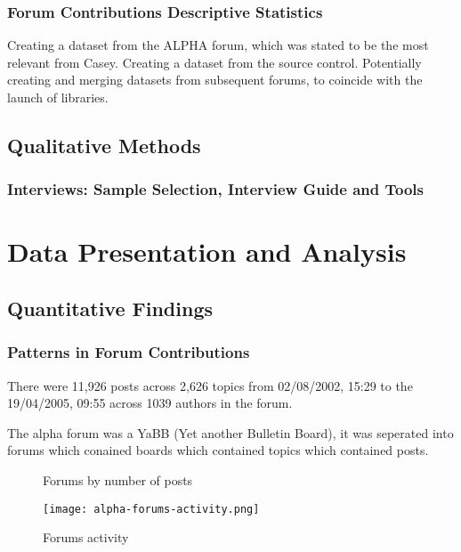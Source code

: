 \documentclass{article}
\begin{document}
\subsubsection{Forum Contributions Descriptive Statistics}

Creating a dataset from the ALPHA forum, which was stated to be the most relevant from Casey.
Creating a dataset from the source control.
Potentially creating and merging datasets from subsequent forums, to coincide with the launch of libraries.

\subsection{Qualitative Methods}
\subsubsection{Interviews: Sample Selection, Interview Guide and Tools}


\section{Data Presentation and Analysis}

\subsection{Quantitative Findings}

\subsubsection{Patterns in Forum Contributions}
There were 11,926 posts across 2,626 topics from 02/08/2002, 15:29 to the 19/04/2005, 09:55 across 1039 authors in the forum.

The alpha forum was a YaBB (Yet another Bulletin Board), it was seperated into forums which conained boards which contained topics which contained posts.

\begin{figure}[h!] 
  \centering 
  
  \caption{Forums by number of posts}
  \label{fig:forums}  
\end{figure}



\begin{figure}[htbp] 
  \centering
  \texttt{[image: alpha-forums-activity.png]} 
  \caption{Forums activity}
  \label{fig:forum-activity}  
\end{figure}
\end{document}
